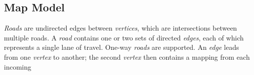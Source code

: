 \documentclass[letterpaper, 10 pt, conference]{ieeeconf}  %
\begin{document}
\subsection{Map Model}



\emph{Roads} are undirected edges between \emph{vertices}, which are
intersections between multiple roads. A \emph{road} contains one or two sets of
directed \emph{edges}, each of which represents a single lane of travel. One-way
\emph{roads} are supported. An \emph{edge} leads from one \emph{vertex} to
another; the second \emph{vertex} then contains a mapping from each incoming
\end{document}
